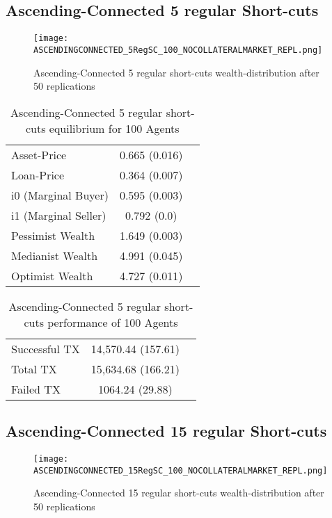 \documentclass[Bachelorarbeit.tex]{subfiles}
\begin{document}
\subsection{Ascending-Connected 5 regular Short-cuts }
\begin{figure}[!htbp]
	\centering
  \texttt{[image: ASCENDINGCONNECTED\_5RegSC\_100\_NOCOLLATERALMARKET\_REPL.png]}
	\caption{Ascending-Connected 5 regular short-cuts wealth-distribution after 50 replications}
	\label{fig1}
\end{figure}

\begin{table}[!htbp]
	\caption{Ascending-Connected 5 regular short-cuts equilibrium for 100 Agents}
	\centering
	\begin{tabular} { l c r }
		\hline
		Asset-Price & 0.665 (0.016) \\
		Loan-Price & 0.364 (0.007) \\
		i0 (Marginal Buyer) & 0.595 (0.003) \\
		i1 (Marginal Seller) & 0.792 (0.0) \\
		Pessimist Wealth & 1.649 (0.003) \\
		Medianist Wealth & 4.991 (0.045) \\
		Optimist Wealth & 4.727 (0.011) \\
		\hline
	\end{tabular}
\end{table} 

\begin{table}[!htbp]
	\caption{Ascending-Connected 5 regular short-cuts performance of 100 Agents}
	\centering
	\begin{tabular} { l c r }
		\hline
		Successful TX & 14,570.44 (157.61) \\
		Total TX & 15,634.68 (166.21) \\
		Failed TX & 1064.24 (29.88) \\
		\hline
	\end{tabular}
\end{table}

\subsection{Ascending-Connected 15 regular Short-cuts }
\begin{figure}[!htbp]
	\centering
  \texttt{[image: ASCENDINGCONNECTED\_15RegSC\_100\_NOCOLLATERALMARKET\_REPL.png]}
	\caption{Ascending-Connected 15 regular short-cuts wealth-distribution after 50 replications}
	\label{fig1}
\end{figure}
\end{document}
